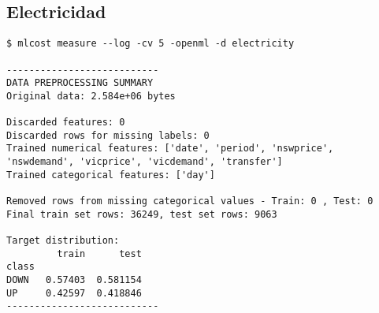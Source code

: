 \subsection{Electricidad}
\begin{verbatim}
$ mlcost measure --log -cv 5 -openml -d electricity

---------------------------
DATA PREPROCESSING SUMMARY
Original data: 2.584e+06 bytes

Discarded features: 0
Discarded rows for missing labels: 0
Trained numerical features: ['date', 'period', 'nswprice', 'nswdemand', 'vicprice', 'vicdemand', 'transfer']
Trained categorical features: ['day']

Removed rows from missing categorical values - Train: 0 , Test: 0
Final train set rows: 36249, test set rows: 9063

Target distribution:
         train      test
class                   
DOWN   0.57403  0.581154
UP     0.42597  0.418846
---------------------------
\end{verbatim}